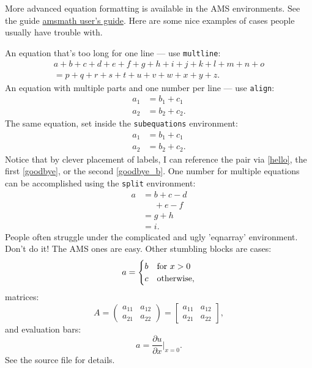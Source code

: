 More advanced equation formatting is available in the AMS environments.  See
the guide \href{ftp://ftp.ams.org/pub/tex/doc/amsmath/amsldoc.pdf}{amsmath
user's guide}.  Here are some nice examples of cases people usually have
trouble with.

An equation that's too long for one line --- use \texttt{multline}:
\begin{multline}
	a +b+c+d+e+f+g+h+i+j+k+l+m+n+o\\ 
	= p+q+r+s+t+u+v+w+x+y+z.
\end{multline}
An equation with multiple parts and one number per line --- use
\texttt{align}:
\begin{align}
	a_1 &= b_1 + c_1\\
	a_2 &= b_2 + c_2.
\end{align}
The same equation, set inside the \texttt{subequations} environment:
\begin{subequations}
	\label{hello}
	\begin{align}
		\label{goodbye}
		a_1 &= b_1 + c_1\\
		\label{goodbye_b}
		a_2 &= b_2 + c_2.
	\end{align}
\end{subequations}
Notice that by clever placement of labels, I can reference the pair via
\eqref{hello}, the first \eqref{goodbye}, or the second \eqref{goodbye_b}.
One number for multiple equations can be accomplished using the
\texttt{split} environment:
\begin{equation}
	\begin{split}
		a &= b + c - d\\
		 &\phantom{=} + e - f\\
		 &= g + h\\
		 &= i.
	\end{split}
\end{equation}
People often struggle under the complicated and ugly 'eqnarray' environment.
Don't do it!  The AMS ones are easy.  Other stumbling blocks are cases:
\begin{equation}
	a = \begin{cases}
		b & \text{for $ x > 0$}\\
		c & \text{otherwise,}
	\end{cases}
\end{equation}
matrices:
\begin{equation}
	A = \begin{pmatrix} a_{11} & a_{12} \\ a_{21} & a_{22} \end{pmatrix}
     = \begin{bmatrix} a_{11} & a_{12} \\ a_{21} & a_{22} \end{bmatrix},
\end{equation}
and evaluation bars:
\begin{equation}
	a = \frac{\partial u}{\partial x}\bigg\lvert_{x=0}.
\end{equation}
See the source file for details.


